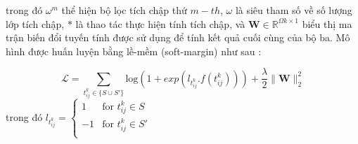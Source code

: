 trong đó $\omega^m$ thể hiện bộ lọc tích chập thứ $m-th$,
\(\omega\) là siêu tham số về số lượng lớp tích chập, \(\ast\) là thao tác thực hiện tính tích chập, và \(\mathbf{W} \in \mathbb{R}^{\Omega k \times 1}\)
biểu thị ma trận biến đổi tuyến tính được sử dụng để tính kết quả cuối cùng của bộ ba. Mô hình được huấn luyện bằng lề-mềm (soft-margin) như sau :

\begin{equation}
\mathcal{L} = \sum_{t^k_{ij} \in \{S \cup S'\}} \text{log}(1 + exp(l_{t^k_{ij}} . f(t^k_{ij}))) + \frac{\lambda}{2} \parallel{\mathbf{W}}\parallel_2^2
\end{equation}
trong đó $l_{t^k_{ij}} = \begin{cases}
1 &\text{for } t^k_{ij} \in S \\
-1 &\text{for } t^k_{ij} \in S' \\
\end{cases}$

